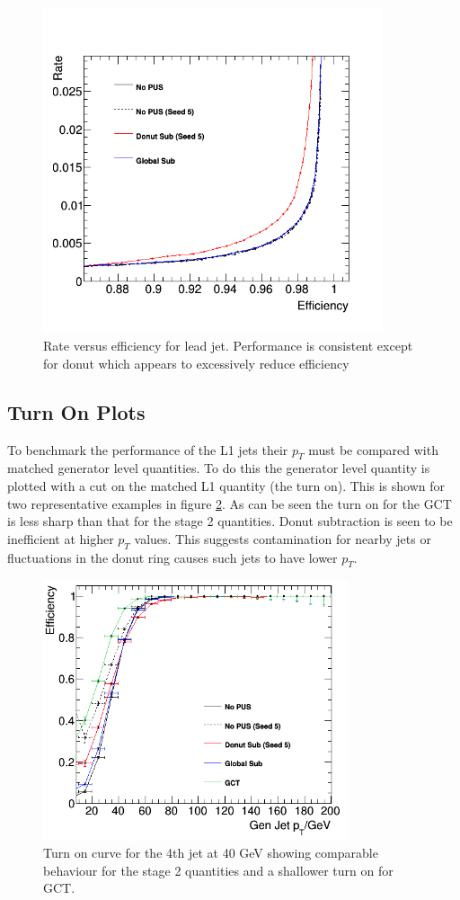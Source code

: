 \begin{figure}
\centering
    \includegraphics[width=10cm]{./Figures/jet1RateEff}
  \caption{Rate versus efficiency for lead jet. Performance is consistent except for donut which appears to excessively reduce efficiency}
  \label{fig:label:rateeff}
\end{figure}
\subsection{Turn On Plots}
To benchmark the performance of the L1 jets their $p_T$ must be compared with matched generator level quantities. To do this the generator level quantity is plotted with a cut on the matched L1 quantity (the turn on). This is shown for two representative examples in figure \ref{turnon}. As can be seen the turn on for the GCT is less sharp than that for the stage 2 quantities. Donut subtraction is seen to be inefficient at higher $p_T$ values. This suggests contamination for nearby jets or fluctuations in the donut ring causes such jets to have lower $p_T$.
\begin{figure}
\centering
    \includegraphics[width=0.8\textwidth]{Figures/jet4_40}
  \caption{Turn on curve for the 4th jet at 40 GeV showing comparable behaviour for the stage 2 quantities and a shallower turn on for GCT.}
  \label{turnon}
\end{figure}
